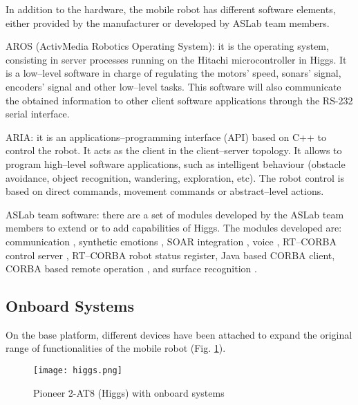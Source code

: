 In addition to the hardware, the mobile robot has different software elements, either provided by the manufacturer or developed by ASLab team members. 
\begin{description}
\item AROS (ActivMedia Robotics Operating System): it is the operating system, consisting in server processes running on the Hitachi microcontroller in Higgs. It is a low--level software in charge of regulating the motors' speed, sonars' signal, encoders' signal and other low--level tasks. This software will also communicate the obtained information to other client software applications through the RS-232 serial interface.
\item ARIA: it is an applications--programming interface (API) based on C++ to control the robot. It acts as the client in the client--server topology. It allows to program high--level software applications, such as intelligent behaviour (obstacle avoidance, object recognition, wandering, exploration, etc). The robot control is based on direct commands, movement commands or abstract--level actions.
\item ASLab team software: there are a set of modules developed by the ASLab team members to extend or to add capabilities of Higgs. The modules developed are: communication \cite{Pareja2004}, synthetic emotions \cite{Conde2005}, SOAR integration \cite{Sanchez2005}, voice \cite{Panizo2005}, RT--CORBA control server \cite{Hernando2005}, RT--CORBA robot status register, Java based CORBA client, CORBA based remote operation \cite{Conejo2007}, and surface recognition \cite{Godoy2007}. 
\end{description}

\subsection{Onboard Systems}

On the base platform, different devices have been attached to expand the original range of functionalities of the mobile robot (Fig. \ref{higgswithonboarddevices}).\\

\begin{figure}[htdp]
\begin{center}
 {\texttt{[image: higgs.png]}}
\end{center}
\caption{Pioneer 2-AT8 (Higgs) with onboard systems}
\label{higgswithonboarddevices}
\end{figure}

